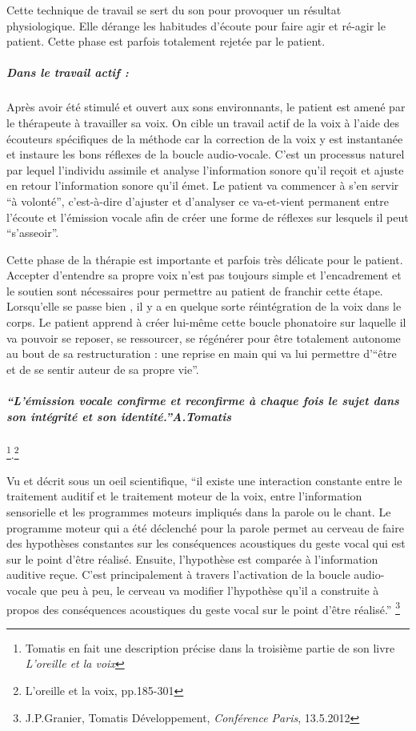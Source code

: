 Cette technique de travail se sert du son pour provoquer un résultat
physiologique. Elle dérange les habitudes d'écoute pour faire agir
et ré-agir le patient. Cette phase est parfois totalement rejetée
par le patient.

\subparagraph{Dans le travail actif :}

Après avoir été stimulé et ouvert aux sons environnants, le patient
est amené par le thérapeute à travailler sa voix. On cible un travail
actif de la voix à l'aide des écouteurs spécifiques de la méthode
car la correction de la voix y est instantanée et instaure les bons
réflexes de la boucle audio-vocale. C'est un processus naturel par
lequel l'individu assimile et analyse l'information sonore qu'il reçoit
et ajuste en retour l'information sonore qu'il émet. Le patient va
commencer à s'en servir ``à volonté'', c'est-à-dire d'ajuster et
d'analyser ce va-et-vient permanent entre l'écoute et l'émission vocale
afin de créer une forme de réflexes sur lesquels il peut ``s'asseoir''. 

Cette phase de la thérapie est importante et parfois très délicate
pour le patient. Accepter d'entendre sa propre voix n'est pas toujours
simple et l'encadrement et le soutien sont nécessaires pour permettre
au patient de franchir cette étape. Lorsqu'elle se passe bien , il
y a en quelque sorte réintégration de la voix dans le corps. Le patient
apprend à créer lui-même cette boucle phonatoire sur laquelle il va
pouvoir se reposer, se ressourcer, se régénérer pour être totalement
autonome au bout de sa restructuration : une reprise en main qui va
lui permettre d'``être et de se sentir auteur de sa propre vie''. 

\subparagraph{\textmd{\emph{``L'émission vocale confirme et reconfirme à chaque
fois le sujet dans son intégrité et son identité.''A.Tomatis}}}

\footnote{Tomatis en fait une description précise dans la troisième partie de
son livre\emph{ L'oreille et la voix}}.\footnote{L'oreille et la voix, pp.185-301}

Vu et décrit sous un oeil scientifique, ``il existe une interaction
constante entre le traitement auditif et le traitement moteur de la
voix, entre l'information sensorielle et les programmes moteurs impliqués
dans la parole ou le chant. Le programme moteur qui a été déclenché
pour la parole permet au cerveau de faire des hypothèses constantes
sur les conséquences acoustiques du geste vocal qui est sur le point
d'être réalisé. Ensuite, l'hypothèse est comparée à l'information
auditive reçue. C'est principalement à travers l'activation de la
boucle audio-vocale que peu à peu, le cerveau va modifier l'hypothèse
qu'il a construite à propos des conséquences acoustiques du geste
vocal sur le point d'être réalisé.'' \footnote{J.P.Granier, Tomatis Développement,\emph{ Conférence Paris}, 13.5.2012}
